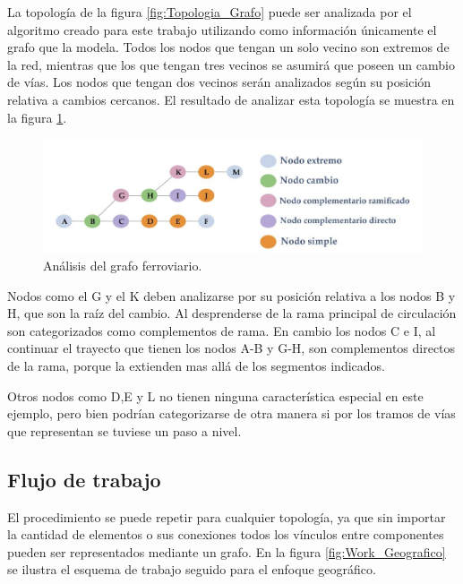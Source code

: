 		La topología de la figura \ref{fig:Topologia_Grafo} puede ser analizada por el algoritmo creado para este trabajo utilizando como información únicamente el grafo que la modela. Todos los nodos que tengan un solo vecino son extremos de la red, mientras que los que tengan tres vecinos se asumirá que poseen un cambio de vías. Los nodos que tengan dos vecinos serán analizados según su posición relativa a cambios cercanos. El resultado de analizar esta topología se muestra en la figura \ref{fig:Grafo_Analisis}.
	
		\begin{figure}[h]
		\centering
			\includegraphics[scale=.4]{./Figures/Grafo}
			\caption{Análisis del grafo ferroviario.}
			\label{fig:Grafo_Analisis}
		\end{figure}
	
		Nodos como el G y el K deben analizarse por su posición relativa a los nodos B y H, que son la raíz del cambio. Al desprenderse de la rama principal de circulación son categorizados como complementos de rama. En cambio los nodos C e I, al continuar el trayecto que tienen los nodos A-B y G-H, son complementos directos de la rama, porque la extienden mas allá de los segmentos indicados.
		
		Otros nodos como D,E y L no tienen ninguna característica especial en este ejemplo, pero bien podrían categorizarse de otra manera si por los tramos de vías que representan se tuviese un paso a nivel.
	
		\subsection{Flujo de trabajo}
		
		El procedimiento se puede repetir para cualquier topología, ya que sin importar la cantidad de elementos o sus conexiones todos los vínculos entre componentes pueden ser representados mediante un grafo. En la figura \ref{fig:Work_Geografico} se ilustra el esquema de trabajo seguido para el enfoque geográfico.	
		

